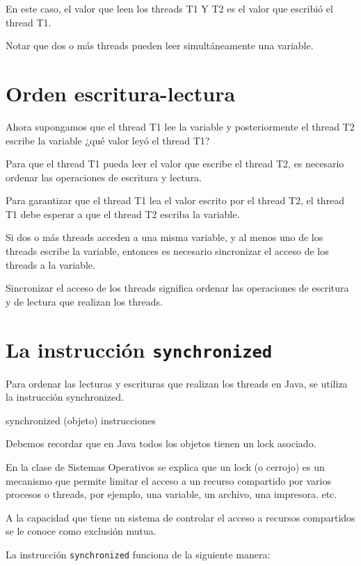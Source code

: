 En este caso, el valor que leen los threads T1 Y T2 es el valor que escribió el thread T1.

Notar que dos o más threads pueden leer simultáneamente una variable.

\section{Orden escritura-lectura}

Ahora supongamos que el thread T1 lee la variable y posteriormente el thread T2 escribe la variable ¿qué valor leyó el thread T1?

Para que el thread T1 pueda leer el valor que escribe el thread T2, es necesario ordenar las operaciones de escritura y lectura.

Para garantizar que el thread T1 lea el valor escrito por el thread T2, el thread T1 debe esperar a que el thread T2 escriba la variable.

Si dos o más threads acceden a una misma variable, y al menos uno de los threads escribe la variable, entonces es necesario sincronizar el acceso de los threads a la variable.

Sincronizar el acceso de los threads significa ordenar las operaciones de escritura y de lectura que realizan los threads.

\section{La instrucción \texttt{synchronized}}

Para ordenar las lecturas y escrituras que realizan los threads en Java, se utiliza la instrucción synchronized.

\begin{SourceCode}
synchronized (objeto)
{
  instrucciones
}
\end{SourceCode}

Debemos recordar que en Java todos los objetos tienen un lock asociado.

En la clase de Sistemas Operativos se explica que un lock (o cerrojo) es un mecanismo que permite limitar el acceso a un recurso compartido por varios procesos o threads, por ejemplo, una variable, un archivo, una impresora. etc. 

A la capacidad que tiene un sistema de controlar el acceso a recursos compartidos se le conoce como exclusión mutua.

La instrucción \texttt{synchronized} funciona de la siguiente manera:

